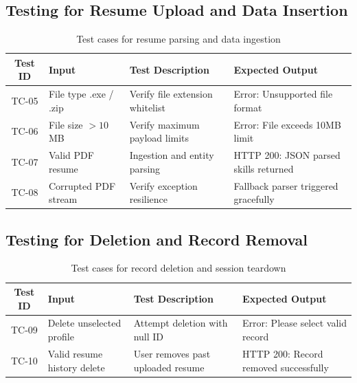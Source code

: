 \documentclass[12pt,a4paper]{report}
\begin{document}
\subsection{Testing for Resume Upload and Data Insertion}
\begin{table}[htbp]
   \caption{Test cases for resume parsing and data ingestion}
    \label{tab:test_insertion}
    \centering
    \begin{tabularx}{\textwidth}{|c|X|X|X|}
        \hline
        \textbf{Test ID} & \textbf{Input} & \textbf{Test Description} & \textbf{Expected Output} \\
        \hline
        TC-05 & File type .exe / .zip & Verify file extension whitelist & Error: Unsupported file format \\
        \hline
        TC-06 & File size $> 10$ MB & Verify maximum payload limits & Error: File exceeds 10MB limit \\
        \hline
        TC-07 & Valid PDF resume & Ingestion and entity parsing & HTTP 200: JSON parsed skills returned \\
        \hline
        TC-08 & Corrupted PDF stream & Verify exception resilience & Fallback parser triggered gracefully \\
        \hline
    \end{tabularx}
\end{table}

\subsection{Testing for Deletion and Record Removal}
\begin{table}[htbp]
\caption{Test cases for record deletion and session teardown}
    \label{tab:test_deletion}
    \centering
    \begin{tabularx}{\textwidth}{|c|X|X|X|}
        \hline
        \textbf{Test ID} & \textbf{Input} & \textbf{Test Description} & \textbf{Expected Output} \\
        \hline
        TC-09 & Delete unselected profile & Attempt deletion with null ID & Error: Please select valid record \\
        \hline
        TC-10 & Valid resume history delete & User removes past uploaded resume & HTTP 200: Record removed successfully \\
        \hline
    \end{tabularx}
\end{table}

\newpage
\end{document}
